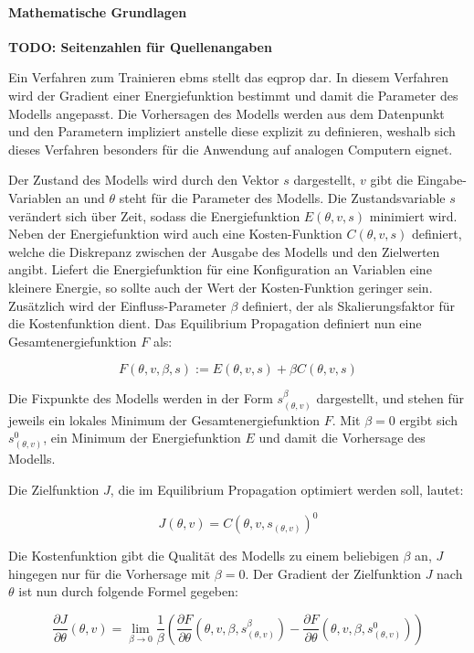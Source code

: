 \paragraph{Mathematische Grundlagen}

\textbf{TODO: Seitenzahlen für Quellenangaben}

Ein Verfahren zum Trainieren \glspl{ebm} stellt das \gls{eqprop} dar. In diesem Verfahren wird der Gradient einer Energiefunktion bestimmt und damit die Parameter des Modells angepasst. Die Vorhersagen des Modells werden aus dem Datenpunkt und den Parametern impliziert anstelle diese explizit zu definieren, weshalb sich dieses Verfahren besonders für die Anwendung auf analogen Computern eignet. \cite{Scellier2017}

Der Zustand des Modells wird durch den Vektor \(s\) dargestellt, \(v\) gibt die Eingabe-Variablen an und \(\theta\) steht für die Parameter des Modells. Die Zustandsvariable \(s\) verändert sich über Zeit, sodass die Energiefunktion \(E(\theta,v,s)\) minimiert wird. Neben der Energiefunktion wird auch eine Kosten-Funktion \(C(\theta,v,s)\) definiert, welche die Diskrepanz zwischen der Ausgabe des Modells und den Zielwerten angibt. Liefert die Energiefunktion für eine Konfiguration an Variablen eine kleinere Energie, so sollte auch der Wert der Kosten-Funktion geringer sein. Zusätzlich wird der Einfluss-Parameter \(\beta\) definiert, der als Skalierungsfaktor für die Kostenfunktion dient. Das Equilibrium Propagation definiert nun eine Gesamtenergiefunktion \(F\) als:

\[F(\theta,v,\beta,s):=E(\theta,v,s)+\beta C(\theta,v,s)\]

Die Fixpunkte des Modells werden in der Form \(s_{(\theta,v)}^\beta\) dargestellt, und stehen für jeweils ein lokales Minimum der Gesamtenergiefunktion \(F\). Mit \(\beta=0\) ergibt sich \(s_{(\theta,v)}^0\), ein Minimum der Energiefunktion \(E\) und damit die Vorhersage des Modells. \cite{Scellier2017}

Die Zielfunktion \(J\), die im Equilibrium Propagation optimiert werden soll, lautet:

\[J(\theta,v)=C(\theta,v,s_{(\theta,v)})^0\]

Die Kostenfunktion gibt die Qualität des Modells zu einem beliebigen \(\beta\) an, \(J\) hingegen nur für die Vorhersage mit \(\beta=0\). Der Gradient der Zielfunktion \(J\) nach \(\theta\) ist nun durch folgende Formel gegeben:

\[\frac{\partial J}{\partial \theta}(\theta,v)=\lim\limits_{\beta \to 0}\frac{1}{\beta}\left(\frac{\partial F}{\partial \theta}(\theta,v,\beta,s_{(\theta,v)}^\beta)-\frac{\partial F}{\partial \theta}(\theta,v,\beta,s_{(\theta,v)}^0)\right)\]

